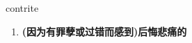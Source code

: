 
\begin{frame}
{\huge contrite}
\begin{center}
\begin{enumerate}\Large
  \item \textbf{(因为有罪孽或过错而感到)后悔悲痛的}
\end{enumerate}
\end{center}
\end{frame}
